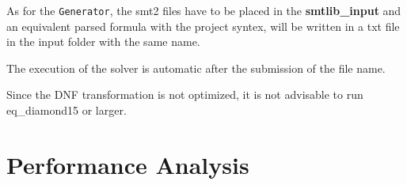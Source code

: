 \documentclass[11pt,a4paper]{article}
\begin{document}
    As for the \texttt{Generator}, the smt2 files have to be placed in the \textbf{smtlib\_input} and an equivalent parsed formula with the project syntex, will be written in a txt file in the input folder with the same name. 

    The execution of the solver is automatic after the submission of the file name.

    Since the DNF transformation is not optimized, it is not advisable to run eq\_diamond15 or larger.

    \section{Performance Analysis}





    
        
\end{document}
